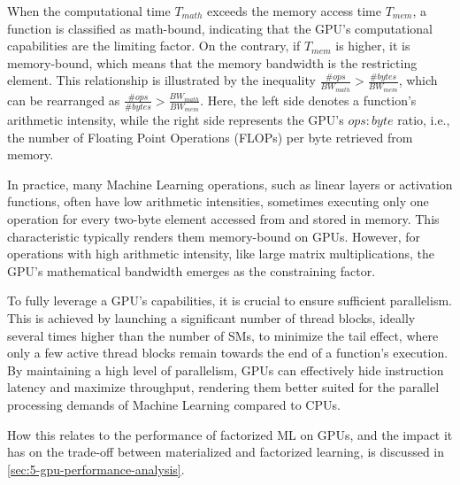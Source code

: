 When the computational time $ T_{math} $ exceeds the memory access time $ T_{mem} $, a function is classified as math-bound, indicating that the GPU's computational capabilities are the limiting factor. On the contrary, if $ T_{mem} $ is higher, it is memory-bound, which means that the memory bandwidth is the restricting element. This relationship is illustrated by the inequality $ \frac{\# ops}{BW_{math}} > \frac{\# bytes}{BW_{mem}} $, which can be rearranged as $ \frac{\# ops}{\# bytes} > \frac{BW_{math}}{BW_{mem}} $. Here, the left side denotes a function's arithmetic intensity, while the right side represents the GPU's $ops:byte$ ratio, i.e., the number of Floating Point Operations (FLOPs) per byte retrieved from memory.

In practice, many Machine Learning operations, such as linear layers or activation functions, often have low arithmetic intensities, sometimes executing only one operation for every two-byte element accessed from and stored in memory. This characteristic typically renders them memory-bound on GPUs. However, for operations with high arithmetic intensity, like large matrix multiplications, the GPU's mathematical bandwidth emerges as the constraining factor.

To fully leverage a GPU's capabilities, it is crucial to ensure sufficient parallelism. This is achieved by launching a significant number of thread blocks, ideally several times higher than the number of SMs, to minimize the tail effect, where only a few active thread blocks remain towards the end of a function's execution. By maintaining a high level of parallelism, GPUs can effectively hide instruction latency and maximize throughput, rendering them better suited for the parallel processing demands of Machine Learning compared to CPUs.

How this relates to the performance of factorized ML on GPUs, and the impact it has on the trade-off between materialized and factorized learning, is discussed in \autoref{sec:5-gpu-performance-analysis}.